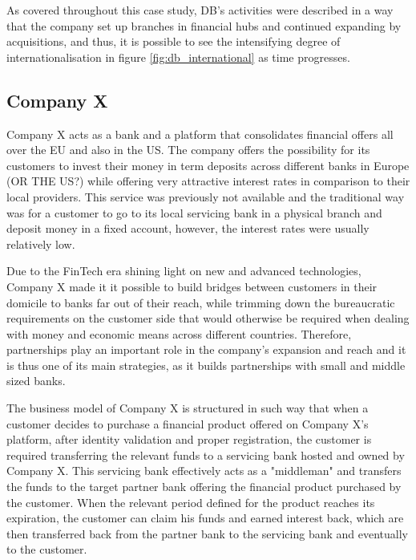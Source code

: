 \documentclass[11pt,a4paper]{article}
\begin{document}
{{As covered throughout this case study, DB's activities were described in a way that the company set up branches in financial hubs and continued expanding by acquisitions, and thus, it is possible to see the intensifying degree of internationalisation in figure \ref{fig:db_international} as time progresses.

\vspace{-2mm}
\subsection{Company X}
\vspace{-1mm}
 \par Company X acts as a bank and a platform that consolidates financial offers all over the EU and also in the US. The company offers the possibility for its customers to invest their money in term deposits across different banks in Europe (OR THE US?) while offering very attractive interest rates in comparison to their local providers. This service was previously not available and the traditional way was for a customer to go to its local servicing bank in a physical branch and deposit money in a fixed account, however, the interest rates were usually relatively low. \par 
Due to the FinTech era shining light on new and advanced technologies, Company X made it it possible to build bridges between customers in their domicile to banks far out of their reach, while trimming down the bureaucratic requirements on the customer side that would otherwise be required when dealing with money and economic means across different countries. Therefore, partnerships play an important role in the company's expansion and reach and it is thus one of its main strategies, as it builds partnerships with small and middle sized banks.  \par
The business model of Company X is structured in such way that when a customer decides to purchase a financial product offered on Company X's platform, after identity validation and proper registration, the customer is required transferring the relevant funds to a servicing bank hosted and owned by Company X. This servicing bank effectively acts as a "middleman" and transfers the funds to the target partner bank offering the financial product purchased by the customer. When the relevant period defined for the product reaches its expiration, the customer can claim his funds and earned interest back, which are then transferred back from the partner bank to the servicing bank and eventually to the customer. \par 
}}
\end{document}
